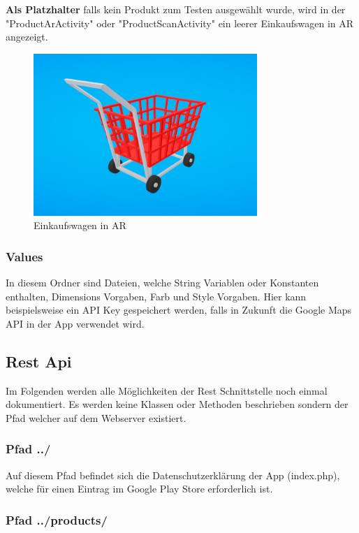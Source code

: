 \documentclass{scrartcl}
\begin{document}
\noindent \textbf{Als Platzhalter} falls kein Produkt zum Testen ausgewählt wurde, wird in der "ProductArActivity" oder "ProductScanActivity" ein leerer Einkaufswagen in AR angezeigt. \newline 
\begin{figure}[h]
\centering
\includegraphics[width=320px]{img/cart.JPG}
\caption{Einkaufswagen in AR}
\end{figure}

\subsubsection{Values}

In diesem Ordner sind Dateien, welche String Variablen oder Konstanten enthalten, Dimensions Vorgaben, Farb und Style Vorgaben. Hier kann beispielsweise ein API Key gespeichert werden, falls in Zukunft die Google Maps API in der App verwendet wird.

\newpage

\subsection{Rest Api}
Im Folgenden werden alle Möglichkeiten der Rest Schnittstelle noch einmal dokumentiert. Es werden keine Klassen oder Methoden beschrieben sondern der Pfad welcher auf dem Webserver existiert.

\subsubsection{Pfad ../}

Auf diesem Pfad befindet sich die Datenschutzerklärung der App (index.php), welche für einen Eintrag im Google Play Store erforderlich ist.

\subsubsection{Pfad ../products/}
\end{document}
